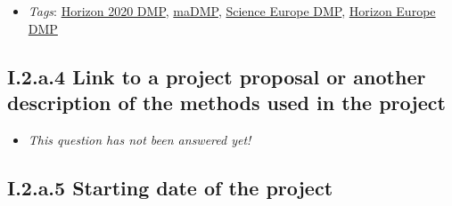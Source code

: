\documentclass[a4paper,12pt]{report}
\begin{document}
\label{1e85da40-bbfc-4180-903e-6c569ed2da38.c3dabaaf-c946-4a0d-889c-ede966f97667.a14632ce-345c-48fa-8757-db609735ca1e.22583d74-3c98-4e0a-b363-26d767c88212}


\begin{itemize}
  \item \textit{Tags}: \ul{Horizon 2020 DMP}, \ul{maDMP}, \ul{Science Europe DMP}, \ul{Horizon Europe DMP}
  \end{itemize}





\subsection*{\protect\textcolor{colorSecId}{I.2.a.4} Link to a project proposal or another description of the methods used in the project}

\label{1e85da40-bbfc-4180-903e-6c569ed2da38.c3dabaaf-c946-4a0d-889c-ede966f97667.a14632ce-345c-48fa-8757-db609735ca1e.a00ae929-d5cf-43c0-8e9e-cdb12ebde717}






\begin{itemize}
  \item[\XSolidBrush] \textit{This question has not been answered yet!}
\end{itemize}
  

\subsection*{\protect\textcolor{colorSecId}{I.2.a.5} Starting date of the project}

\label{1e85da40-bbfc-4180-903e-6c569ed2da38.c3dabaaf-c946-4a0d-889c-ede966f97667.a14632ce-345c-48fa-8757-db609735ca1e.de84b9b5-bcd0-4954-8370-72ea83916b8c}
\end{document}
